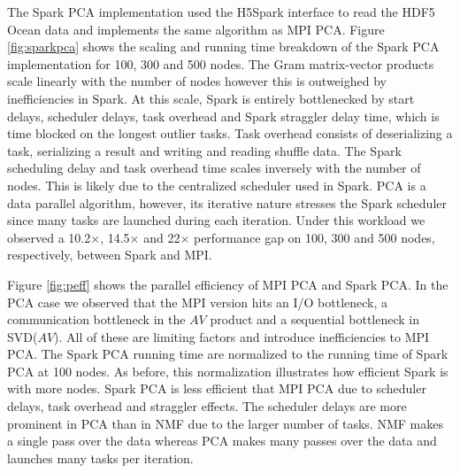 The Spark PCA implementation used the H5Spark interface to read the HDF5 Ocean data and implements the same algorithm as MPI PCA. Figure \ref{fig:sparkpca} shows the scaling and running time breakdown of the Spark PCA implementation for 100, 300 and 500 nodes. The Gram matrix-vector products scale linearly with the number of nodes however this is outweighed by inefficiencies in Spark. At this scale, Spark is entirely bottlenecked by start delays, scheduler delays, task overhead and Spark straggler delay time, which is time blocked on the longest outlier tasks. Task overhead consists of deserializing a task, serializing a result and writing and reading shuffle data.   The Spark scheduling delay and task overhead time scales inversely with the number of nodes. This is likely due to the centralized scheduler used in Spark. PCA is a data parallel algorithm, however, its iterative nature stresses the Spark scheduler since many tasks are launched during each iteration. Under this workload we observed a 10.2$\times$, 14.5$\times$ and 22$\times$ performance gap on 100, 300 and 500 nodes, respectively, between Spark and MPI.

Figure \ref{fig:peff} shows the parallel efficiency of MPI PCA and Spark PCA. In the PCA case we observed that the MPI version hits an I/O bottleneck, a communication bottleneck in the $AV$ product and a sequential bottleneck in SVD($AV$). All of these are limiting factors and introduce inefficiencies to MPI PCA. The Spark PCA running time are normalized to the running time of Spark PCA at 100 nodes. As before, this normalization illustrates how efficient Spark is with more nodes. Spark PCA is less efficient that MPI PCA due to scheduler delays, task overhead and straggler effects. The scheduler delays are more prominent in PCA than in NMF due to the larger number of tasks. NMF makes a single pass over the data whereas PCA makes many passes over the data and launches many tasks per iteration.



